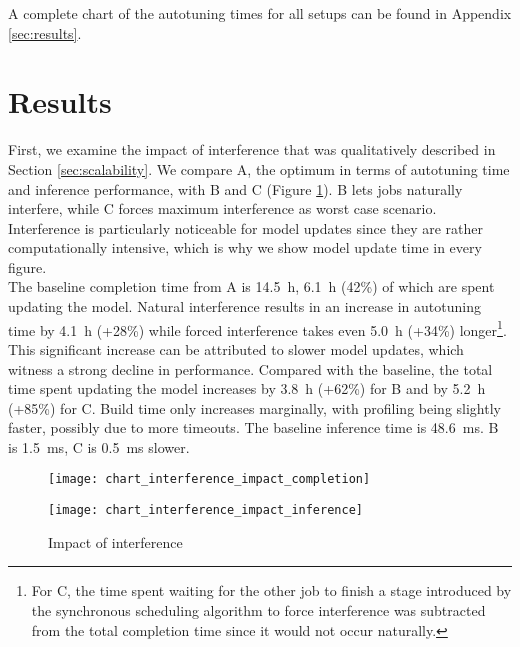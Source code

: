 A complete chart of the autotuning times for all setups can be found in Appendix \ref{sec:results}.

\section{Results}
First, we examine the impact of interference that was qualitatively described in Section \ref{sec:scalability}. We compare A, the optimum in terms of autotuning time and inference performance, with B and C (Figure \ref{fig:chart-interference-impact}). B lets jobs naturally interfere, while C forces maximum interference as worst case scenario. Interference is particularly noticeable for model updates since they are rather computationally intensive, which is why we show model update time in every figure.\\
The baseline completion time from A is \SI{14.5}{\hour}, \SI{6.1}{\hour} (42\%) of which are spent updating the model. Natural interference results in an increase in autotuning time by \SI{4.1}{\hour} (+28\%) while forced interference takes even \SI{5.0}{\hour} (+34\%) longer\footnote{For C, the time spent waiting for the other job to finish a stage introduced by the synchronous scheduling algorithm to force interference was subtracted from the total completion time since it would not occur naturally.}. This significant increase can be attributed to slower model updates, which witness a strong decline in performance. Compared with the baseline, the total time spent updating the model increases by \SI{3.8}{\hour} (+62\%) for B and by \SI{5.2}{\hour} (+85\%) for C. Build time only increases marginally, with profiling being slightly faster, possibly due to more timeouts. The baseline inference time is \SI{48.6}{\milli\second}. B is \SI{1.5}{\milli\second}, C is \SI{0.5}{\milli\second} slower. 

\begin{figure}[t]
	\begin{minipage}[b]{.6\textwidth}
		\centering\texttt{[image: chart\_interference\_impact\_completion]}
		\label{fig:chart-interference-impact-completion}
	\end{minipage}%
	\hfill
	\begin{minipage}[b]{.35\textwidth}
		\centering\texttt{[image: chart\_interference\_impact\_inference]}
		\label{fig:chart-interference-impact-inference}
	\end{minipage}
	\caption{Impact of interference}
	\label{fig:chart-interference-impact}
\end{figure}

